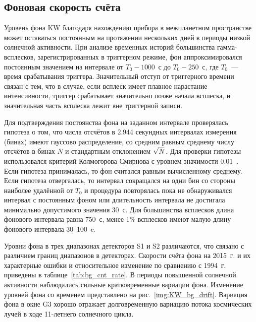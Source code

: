 \subsection{Фоновая скорость счёта}\label{sec:Bg_rate}
Уровень фона KW благодаря нахождению прибора в межпланетном пространстве 
может оставаться постоянным на протяжении нескольких дней в периоды низкой 
солнечной активности. При анализе временных историй большинства гамма-всплесков, 
зарегистрированных в триггерном режиме, фон аппроксимировался 
постоянным значением на интервале от $T_0 - 1000$~с до $T_0 - 250$~с, 
где $T_0$~--- время срабатывания триггера. Значительный отступ от триггерного 
времени связан с тем, что 
в случае, если всплеск имеет плавное нарастание интенсивности, 
триггер срабатывает значительно позже начала всплеска, и
значительная часть всплеска лежит вне триггерной записи. 

Для подтверждения постоянства фона на заданном интервале проверялась гипотеза о том, 
что числа отсчётов в 2.944 секундных интервалах измерения (бинах) 
имеют гауссово распределение, со средним равным среднему числу отсчётов 
в бинах $\overline{N}$ и стандартным отклонением $\sqrt{\overline{N}}$. 
Для проверки гипотезы использовался критерий Колмогорова-Смирнова с уровнем значимости 0.01~\citep{Press_1992NumRec}. 
Если гипотеза принималась, то фон считался равным вычисленному среднему. 
Если гипотеза отвергалась, то интервал сокращался на одни бин со стороны наиболее 
удалённой от $T_0$ и процедура повторялась пока не обнаруживался интервал с постоянным фоном 
или длительность интервала не достигала минимально допустимого значения 30~с. 
Для большинства всплесков длина фонового интервала равна 750~с, менее 1\% 
всплесков имеют малую длину фонового интервала 30--100~c.

Уровни фона в трех диапазонах детекторов S1 и S2 различаются, 
что связано с различием границ диапазонов в детекторах. Скорости счёта фона 
на 2015~г. и их характерные ошибки и относительное изменение по сравнению с 1994~г.
приведены в таблице~\ref{tab:bg_cnt_rate}.
В периоды повышенной солнечной активности наблюдались сильные кратковременные вариации фона. 
Изменение уровней фона со временем представлено на рис.~\ref{img:KW_bg_drift}.
Вариация фона в окне G3 хорошо отражает долговременную вариацию потока космических 
лучей в ходе 11-летнего солнечного цикла. 

 

